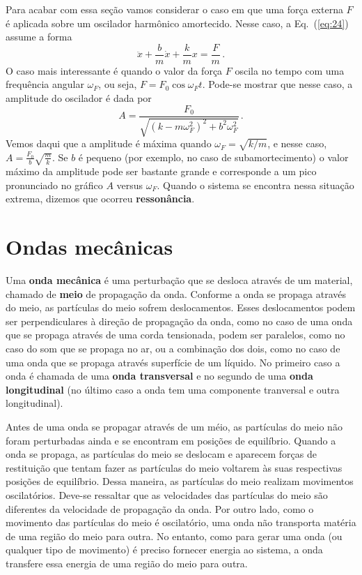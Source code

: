 \documentclass[twocolumn=on,fontsize=12pt,DIV=calc]{scrartcl}
\theoremstyle{definition}
\begin{document}
Para acabar com essa seção vamos considerar o caso em que uma força
externa $F$ é aplicada sobre um oscilador harmônico amortecido. Nesse
caso, a Eq.~(\ref{eq:24}) assume a forma
$$\ddot x+\frac{b}{m}\dot x+\frac{k}{m}x=\frac{F}{m}\,.$$
O caso mais interessante é quando o valor da força $F$ oscila no tempo
com uma frequência angular $\omega_F$, ou seja,
$F=F_0\cos\omega_Ft$. Pode-se mostrar que nesse caso, a amplitude do
oscilador é dada por
$$A=\frac{F_0}{\sqrt{(k-m\omega_F^2)^2+b^2\omega_F^2}}\,.$$
Vemos daqui que a amplitude é máxima quando $\omega_F=\sqrt{k/m}$, e
nesse caso, $A=\frac{F_0}{b}\sqrt{\frac{m}{k}}$. Se $b$ é pequeno (por
exemplo, no caso de subamortecimento) o valor máximo da amplitude pode
ser bastante grande e corresponde a um pico pronunciado no gráfico $A$
versus $\omega_F$. Quando o sistema se encontra nessa situação
extrema, dizemos que ocorreu \textbf{ressonância}.

\section{Ondas mecânicas}

Uma \textbf{onda mecânica} é uma perturbação que se desloca através de
um material, chamado de \textbf{meio} de propagação da onda. Conforme
a onda se propaga através do meio, as partículas do meio sofrem
deslocamentos. Esses deslocamentos podem ser perpendiculares à direção
de propagação da onda, como no caso de uma onda que se propaga através
de uma corda tensionada, podem ser paralelos, como no caso do som que
se propaga no ar, ou a combinação dos dois, como no caso de uma onda
que se propaga através superfície de um líquido. No primeiro caso a
onda é chamada de uma \textbf{onda transversal} e no segundo de uma
\textbf{onda longitudinal} (no último caso a onda tem uma componente
tranversal e outra longitudinal).

Antes de uma onda se propagar através de um méio, as partículas do
meio não foram perturbadas ainda e se encontram em posições de
equilíbrio. Quando a onda se propaga, as partículas do meio se
deslocam e aparecem forças de restituição que tentam fazer as
partículas do meio voltarem às suas respectivas posições de
equilíbrio. Dessa maneira, as partículas do meio realizam movimentos
oscilatórios. Deve-se ressaltar que as velocidades das partículas do
meio são diferentes da velocidade de propagação da onda. Por outro
lado, como o movimento das partículas do meio é oscilatório, uma onda
não transporta matéria de uma região do meio para outra. No entanto,
como para gerar uma onda (ou qualquer tipo de movimento) é preciso
fornecer energia ao sistema, a onda transfere essa energia de uma
região do meio para outra.
\end{document}
